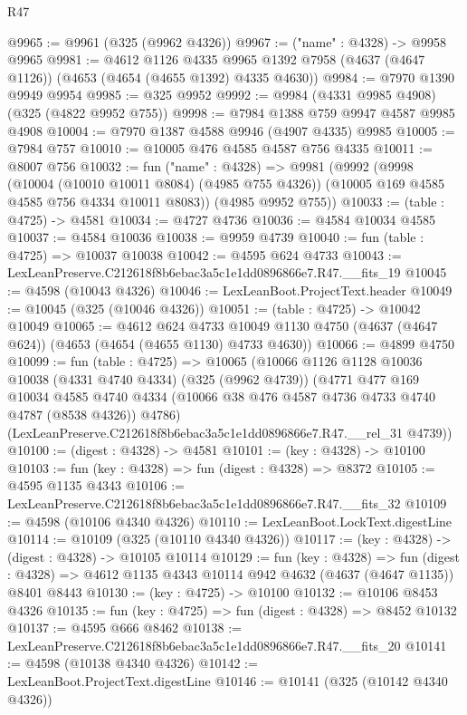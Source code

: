 \begin{lexlean}{R47}
\begin{coremodule}
@9965 := @9961 (@325 (@9962 @4326))
@9967 := ("name" : @4328) -> @9958 @9965
@9981 := @4612
    @1126
    @4335
    @9965
    @1392
    @7958
    (@4637 (@4647 @1126))
    (@4653 (@4654 (@4655 @1392) @4335 @4630))
@9984 := @7970 @1390 @9949 @9954
@9985 := @325 @9952
@9992 := @9984 (@4331 @9985 @4908) (@325 (@4822 @9952 @755))
@9998 := @7984 @1388 @759 @9947 @4587 @9985 @4908
@10004 := @7970 @1387 @4588 @9946 (@4907 @4335) @9985
@10005 := @7984 @757
@10010 := @10005 @476 @4585 @4587 @756 @4335
@10011 := @8007 @756
@10032 := fun ("name" : @4328) =>
  @9981
    (@9992
      (@9998
        (@10004 (@10010 @10011 @8084) (@4985 @755 @4326))
        (@10005 @169 @4585 @4585 @756 @4334 @10011 @8083))
      (@4985 @9952 @755))
@10033 := (table : @4725) -> @4581
@10034 := @4727 @4736
@10036 := @4584 @10034 @4585
@10037 := @4584 @10036
@10038 := @9959 @4739
@10040 := fun (table : @4725) => @10037 @10038
@10042 := @4595 @624 @4733
@10043 := LexLeanPreserve.C212618f8b6ebac3a5c1e1dd0896866e7.R47.__fits_19
@10045 := @4598 (@10043 @4326)
@10046 := LexLeanBoot.ProjectText.header
@10049 := @10045 (@325 (@10046 @4326))
@10051 := (table : @4725) -> @10042 @10049
@10065 := @4612
    @624
    @4733
    @10049
    @1130
    @4750
    (@4637 (@4647 @624))
    (@4653 (@4654 (@4655 @1130) @4733 @4630))
@10066 := @4899 @4750
@10099 := fun (table : @4725) =>
  @10065
    (@10066
      @1126
      @1128
      @10036
      @10038
      (@4331 @4740 @4334)
      (@325 (@9962 @4739))
      (@4771
        @477
        @169
        @10034
        @4585
        @4740
        @4334
        (@10066 @38 @476 @4587 @4736 @4733 @4740 @4787 (@8538 @4326))
        @4786)
      (LexLeanPreserve.C212618f8b6ebac3a5c1e1dd0896866e7.R47.__rel_31 @4739))
@10100 := (digest : @4328) -> @4581
@10101 := (key : @4328) -> @10100
@10103 := fun (key : @4328) => fun (digest : @4328) => @8372
@10105 := @4595 @1135 @4343
@10106 := LexLeanPreserve.C212618f8b6ebac3a5c1e1dd0896866e7.R47.__fits_32
@10109 := @4598 (@10106 @4340 @4326)
@10110 := LexLeanBoot.LockText.digestLine
@10114 := @10109 (@325 (@10110 @4340 @4326))
@10117 := (key : @4328) -> (digest : @4328) -> @10105 @10114
@10129 := fun (key : @4328) =>
  fun (digest : @4328) => @4612 @1135 @4343 @10114 @942 @4632 (@4637 (@4647 @1135)) @8401 @8443
@10130 := (key : @4725) -> @10100
@10132 := @10106 @8453 @4326
@10135 := fun (key : @4725) => fun (digest : @4328) => @8452 @10132
@10137 := @4595 @666 @8462
@10138 := LexLeanPreserve.C212618f8b6ebac3a5c1e1dd0896866e7.R47.__fits_20
@10141 := @4598 (@10138 @4340 @4326)
@10142 := LexLeanBoot.ProjectText.digestLine
@10146 := @10141 (@325 (@10142 @4340 @4326))

\end{coremodule}
\end{lexlean}
